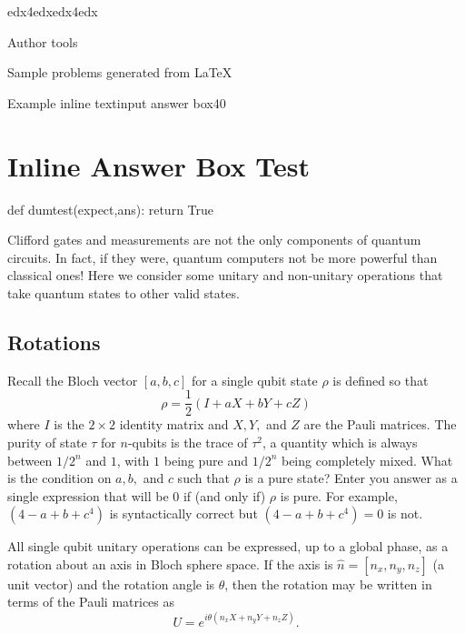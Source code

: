 \documentclass[12pt]{article}
\begin{document}
\begin{edXcourse}{edx4edx}{edx4edx}

\begin{edXchapter}{Author tools}

\begin{edXsection}{Sample problems generated from LaTeX}

\begin{edXsequential}

\begin{edXproblem}{Example inline textinput answer box}{40}

\section{Inline Answer Box Test}  

\begin{edXscript}

def dumtest(expect,ans):
    return True

\end{edXscript}

Clifford gates and measurements are not the only components of quantum
circuits. In fact, if they were, quantum computers not be more
powerful than classical ones! Here we consider some unitary and
non-unitary operations that take quantum states to other valid states.

\subsection{Rotations}

Recall the Bloch vector $[a,b,c]$ for a single qubit state $\rho$ is defined so that 
\begin{equation}
\rho = \frac12(I+aX+bY+cZ)
\end{equation}
where $I$ is the $2\times2$ identity matrix and $X,Y,$ and $Z$ are the
Pauli matrices. The purity of state $\tau$ for $n$-qubits is the trace
of $\tau^2$, a quantity which is always between $1/2^n$ and $1$, with
$1$ being pure and $1/2^n$ being completely mixed. What is the
condition on $a,b,$ and $c$ such that $\rho$ is a pure state? Enter
you answer as a single expression that will be 0 if (and only if)
$\rho$ is pure. For example, $(4-a+b+c^4)$ is syntactically correct
but $(4-a+b+c^4)=0$ is not.


 

All single qubit unitary operations can be expressed, up to a global
phase, as a rotation about an axis in Bloch sphere space. If the axis
is $\hat n=[n_x,n_y,n_z]$ (a unit vector) and the rotation angle is
$\theta$, then the rotation may be written in terms of the Pauli
matrices as
\begin{equation}
U=e^{i\theta\left(n_x X+n_y Y+n_z Z\right)}.
\end{equation}


\end{edXproblem}
\end{edXsequential}
\end{edXsection}
\end{edXchapter}
\end{edXcourse}
\end{document}
